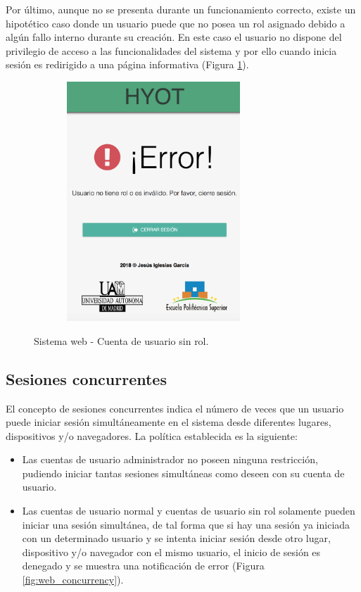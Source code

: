 \documentclass[12pt,a4paper, twoside]{report}
\begin{document}
	Por último, aunque no se presenta durante un funcionamiento correcto, existe un hipotético caso donde un usuario puede que no posea un rol asignado debido a algún fallo interno durante su creación. En este caso el usuario no dispone del privilegio de acceso a las funcionalidades del sistema y por ello cuando inicia sesión es redirigido a una página informativa (Figura \ref{fig:web_noRole}).
	
		\begin{figure}[!ht]   
			\caption{Sistema web - Cuenta de usuario sin rol.} 
			\begin{center} 
	 			\includegraphics[width=9cm, height=9cm]{Images/userGuide/web/noRole} \\
				\label{fig:web_noRole} 
			\end{center}  	
		\end{figure}	
	
	\subsection{Sesiones concurrentes}
	
	El concepto de sesiones concurrentes indica el número de veces que un usuario puede iniciar sesión simultáneamente en el sistema desde diferentes lugares, dispositivos y/o navegadores. La política establecida es la siguiente:
	
	\begin{itemize}
		\item Las cuentas de usuario administrador no poseen ninguna restricción, pudiendo iniciar tantas sesiones simultáneas como deseen con su cuenta de usuario.
		\item Las cuentas de usuario normal y cuentas de usuario sin rol solamente pueden iniciar una sesión simultánea, de tal forma que si hay una sesión ya iniciada con un determinado usuario y se intenta iniciar sesión desde otro lugar, dispositivo y/o navegador con el mismo usuario, el inicio de sesión es denegado y se muestra una notificación de error (Figura \ref{fig:web_concurrency}).
	\end{itemize}
	
\end{document}
